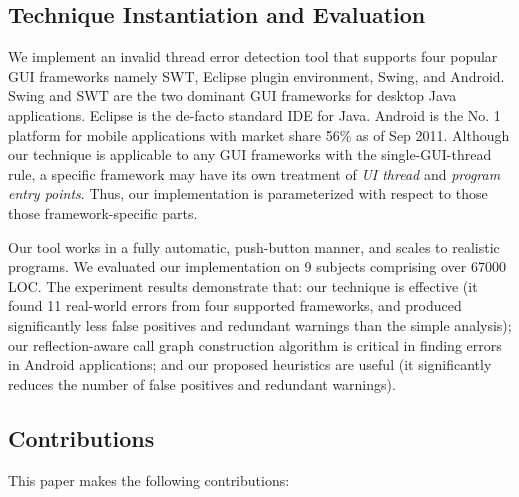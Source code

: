 \subsection{Technique Instantiation and Evaluation}


We implement an invalid thread error detection tool that supports
four popular GUI frameworks namely SWT, Eclipse plugin environment,
Swing, and Android. Swing and SWT are the
two dominant GUI frameworks for desktop Java applications.
Eclipse is the de-facto standard IDE for Java. Android is the No. 1 platform for
mobile applications with market share 56\% as of Sep 2011.
Although our technique is applicable to any GUI
frameworks with the single-GUI-thread rule, a specific framework
may have its own treatment of \textit{UI thread} and \textit{program 
entry points}. Thus, our implementation is parameterized with respect to
those those framework-specific parts.



Our tool works in a fully automatic, push-button manner, and scales to realistic programs.
We evaluated our implementation on 9 subjects comprising over 67000 LOC.
The experiment results demonstrate
that: our technique is effective (it found 11 real-world errors
from four supported frameworks, and produced significantly less
false positives and redundant warnings than the simple analysis);
our reflection-aware call graph construction algorithm is
critical in finding errors in Android applications;
and our proposed
heuristics are useful (it significantly reduces the number of
false positives and redundant warnings).




\subsection{Contributions}

This paper makes the following contributions:

